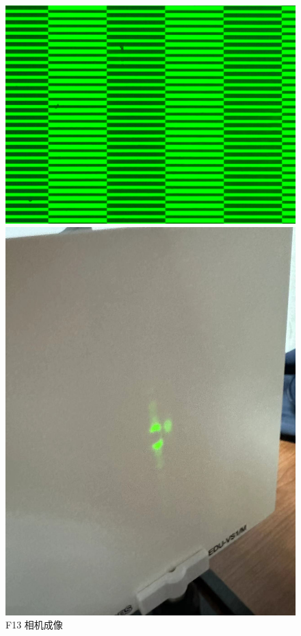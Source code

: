 \documentclass{ctexart}
\begin{document}
\begin{figure}[H]
\begin{minipage}[b]{0.2\textwidth}
    \includegraphics[width=\textwidth]{pictures/F13-nomask-Ex24.png}
    \caption{F13 相机成像}
  \end{minipage}
  \hspace{0.05\textwidth} %
  \begin{minipage}[b]{0.2\textwidth}
    \centering
    \includegraphics[width=\textwidth]{pictures/微信图片_20241010201100.jpg}

\end{minipage}
\end{figure}
\end{document}
